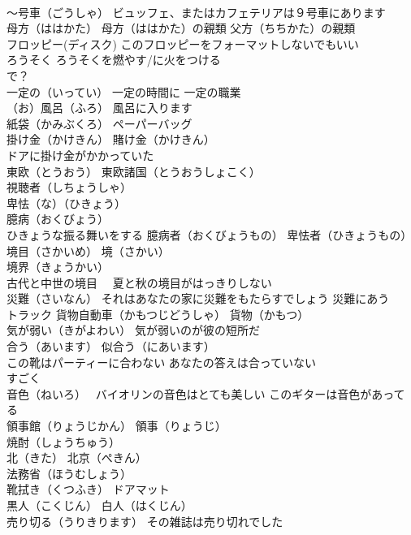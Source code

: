\documentclass[8pt]{extreport}
\begin{document}
\begin{CJK}{UTF8}{min}
\\	～号車（ごうしゃ） ビュッフェ、またはカフェテリアは９号車にあります
\\	母方（ははかた） 母方（ははかた）の親類 父方（ちちかた）の親類
\\	フロッピー(ディスク) このフロッピーをフォーマットしないでもいい
\\	ろうそく ろうそくを燃やす/に火をつける
\\	で？
\\	一定の（いってい） 一定の時間に 一定の職業
\\	（お）風呂（ふろ） 風呂に入ります
\\	紙袋（かみぶくろ） ペーパーバッグ
\\	掛け金（かけきん） 賭け金（かけきん）　
\\	ドアに掛け金がかかっていた
\\	東欧（とうおう） 東欧諸国（とうおうしょこく）
\\	視聴者（しちょうしゃ）
\\	卑怯（な）（ひきょう） 
\\	臆病（おくびょう）
\\	ひきょうな振る舞いをする 臆病者（おくびょうもの） 卑怯者（ひきょうもの）
\\	境目（さかいめ） 境（さかい）
\\	境界（きょうかい）
\\	古代と中世の境目　 夏と秋の境目がはっきりしない
\\	災難（さいなん） それはあなたの家に災難をもたらすでしょう 災難にあう
\\	トラック 貨物自動車（かもつじどうしゃ） 貨物（かもつ）
\\	気が弱い（きがよわい） 気が弱いのが彼の短所だ
\\	合う（あいます） 似合う（にあいます）
\\	この靴はパーティーに合わない あなたの答えは合っていない
\\	すごく
\\	音色（ねいろ）　 バイオリンの音色はとても美しい このギターは音色があってる
\\	領事館（りょうじかん） 領事（りょうじ）
\\	焼酎（しょうちゅう）
\\	北（きた） 北京（ぺきん）
\\	法務省（ほうむしょう）
\\	靴拭き（くつふき） ドアマット
\\	黒人（こくじん） 白人（はくじん）
\\	売り切る（うりきります） その雑誌は売り切れでした

\end{CJK}
\end{document}
